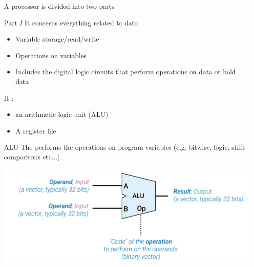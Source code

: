 A processor is divided into two parts
\begin{parag}{Part $I$}
        It concerns everything related to data:
        \begin{itemize}
            \item Variable storage/read/write
            \item Operations on variables
            \item Includes the digital logic circuits that perform operations on data or hold data
        \end{itemize}
        It :
        \begin{itemize}
            \item an arithmetic logic unit (ALU)
            \item A register file
        \end{itemize}
        \begin{subparag}{ALU}
            The  performs the operations on program variables (e.g. bitwise, logic, shift comparisons etc...)
            \begin{center}
                \includegraphics[scale=0.6]{142025-06-20.png}
            \end{center}
            

\end{subparag}
\end{parag}
